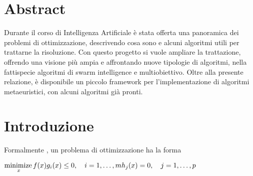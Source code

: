 \documentclass[12pt]{article}
\begin{document}
\maketitle

\section*{\hfil Abstract \hfil}
Durante il corso di Intelligenza Artificiale è stata offerta una panoramica dei problemi di ottimizzazione, descrivendo cosa sono e alcuni algoritmi utili per trattarne la risoluzione. Con questo progetto si vuole ampliare la trattazione, offrendo una visione più ampia e affrontando nuove tipologie di algoritmi, nella fattispecie algoritmi di swarm intelligence e multiobiettivo. Oltre alla presente relazione, è disponibile un piccolo framework per l'implementazione di algoritmi metaeuristici, con alcuni algoritmi già pronti.

\section*{\hfil Introduzione \hfil}

Formalmente \cite{BoydVadenberghe2004}, un problema di ottimizzazione ha la forma \newline 

$\underset{x}{\operatorname{minimize\,}} f(x) \newline
g_i(x) \leq 0, \quad i=1,\dots,m \newline
h_j(x) = 0, \quad j=1,\dots,p$ \newline
\end{document}

